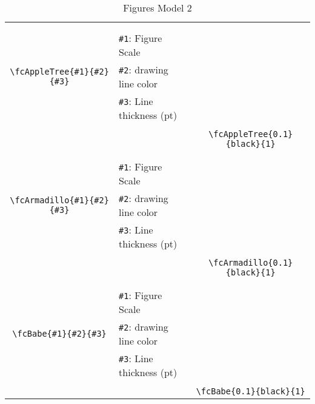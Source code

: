 \documentclass[x11names]{article}
\begin{document}
\begin{table}[H]
\begin{tabular}{|c|l|c|}
	&&\multirow{5}{*}{\fcAppleTree{0.1}{black}{1}}\\	&&\\	&\verb|#1|: Figure Scale &\\	\verb|\fcAppleTree{#1}{#2}{#3}|&	\verb|#2|: drawing line color &\\	&\verb|#3|: Line thickness (pt) &\\ &&\\&&	\verb|\fcAppleTree{0.1}{black}{1}|\\\hline 	
	&&\multirow{5}{*}{\fcArmadillo{0.1}{black}{1}}\\	&&\\	&\verb|#1|: Figure Scale &\\	\verb|\fcArmadillo{#1}{#2}{#3}|&	\verb|#2|: drawing line color &\\	&\verb|#3|: Line thickness (pt) &\\ &&\\&&	\verb|\fcArmadillo{0.1}{black}{1}|\\\hline 	
	&&\multirow{5}{*}{\fcBabe{0.1}{black}{1}}\\	&&\\	&\verb|#1|: Figure Scale &\\	\verb|\fcBabe{#1}{#2}{#3}|&	\verb|#2|: drawing line color &\\	&\verb|#3|: Line thickness (pt) &\\ &&\\&&	\verb|\fcBabe{0.1}{black}{1}|\\\hline 	\hline\end{tabular}\caption{Figures Model 2}\label{tab2}\end{table}
\end{document}
